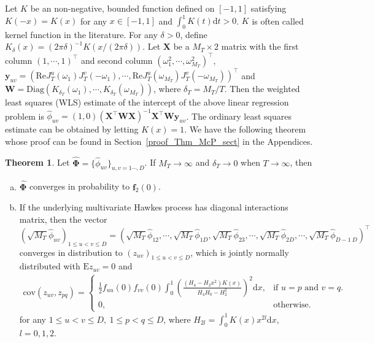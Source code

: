 \documentclass[11pt]{article}
\numberwithin{equation}{section}
\theoremstyle{plain}
\theoremstyle{definition}
\theoremstyle{definition}
\theoremstyle{assumption}
\theoremstyle{proposition}
\theoremstyle{proposition}
\theoremstyle{example}
\theoremstyle{lemma}
\theoremstyle{theorem}
\newtheorem{theorem}{Theorem}[section]
\theoremstyle{remark}
\begin{document}
Let $K$ be an non-negative, bounded function defined on $[-1,1]$ satisfying $K(-x) = K(x)$ for any $x\in[-1,1]$ and $\int_0^1K(t)\mathrm{d}t>0$. $K$ is often called kernel function in the literature. For any $\delta>0$, define $K_{\delta}(x) = (2\pi\delta)^{-1}K(x/(2\pi\delta))$. Let $\mathbf{X}$ be a $M_T\times 2$ matrix with the first column $(1,\cdots,1)^{\top}$ and second column $(\omega_1^2,\cdots,\omega_{M_T}^2)^{\top}$, $\mathbf{y}_{uv}=(\mathrm{Re}J_{T}^{u}(\omega_1)J_{T}^{v}(-\omega_1),\cdots,\mathrm{Re}J_{T}^{u}(\omega_{M_T})J_{T}^{v}(-\omega_{M_T}))^{\top}$ and $\mathbf{W} = \text{Diag}(K_{\delta_T}(\omega_1),\cdots,K_{\delta_T}(\omega_{M_T}))$, where $\delta_T = M_T/T$. Then the weighted least squares (WLS) estimate of the intercept of the above linear regression problem is $\hat{\phi}_{uv} = (1,0)(\mathbf{X}^{\top}\mathbf{W}\mathbf{X})^{-1}\mathbf{X}^{\top}\mathbf{W}\mathbf{y}_{uv}$. The ordinary least squares estimate can be obtained by letting $K(x)=1$. We have the following theorem whose proof can be found in Section~\ref{proof_Thm_McP_sect} in the Appendices.
\begin{theorem}\label{Thm_McP}
Let $\hat{\boldsymbol\Phi} = \{\hat{\phi}_{uv}\}_{u,v=1\cdots,D}$. If $M_T\rightarrow\infty$ and $\delta_T\rightarrow0$ when $T\rightarrow\infty$, then 
\begin{enumerate}[(a)]
    \item $\hat{\boldsymbol\Phi}$ converges in probability to $\boldsymbol f_2(0)$.
    \item If the underlying multivariate Hawkes process has diagonal interactions matrix, then the vector $(\sqrt{M_T}\hat{\phi}_{uv})_{1\leqslant u<v\leqslant D} = (\sqrt{M_T}\hat{\phi}_{12},\cdots,\sqrt{M_T}\hat{\phi}_{1D},\sqrt{M_T}\hat{\phi}_{23},\cdots,\sqrt{M_T}\hat{\phi}_{2D},\cdots,\sqrt{M_T}\hat{\phi}_{D-1~D})^{\top}$ converges in distribution to $(z_{uv})_{1\leqslant u<v\leqslant D}$, which is jointly normally distributed with $\mathrm{E}z_{uv}=0$ and 
    \begin{align*}
       \mathrm{cov}(z_{uv}, z_{pq}) 
       =\begin{cases}
         \frac{1}{2}f_{uu}(0)f_{vv}(0)\int_{0}^{1} \left(\frac{(H_4 - H_2 x^2)K(x)}{H_4H_0 - H_2^2}\right)^2\mathrm{d}x, & \text{if }u=p\text{ and }v=q.\\
         0, & \text{otherwise}.
         \end{cases} 
    \end{align*} 
    for any $1\leqslant u<v\leqslant D,~1\leqslant p<q\leqslant D$, where $H_{2l} = \int_{0}^{1}K(x)x^{2l}\mathrm{d}x$, $l=0,1,2$.
\end{enumerate}
\end{theorem}
\end{document}

